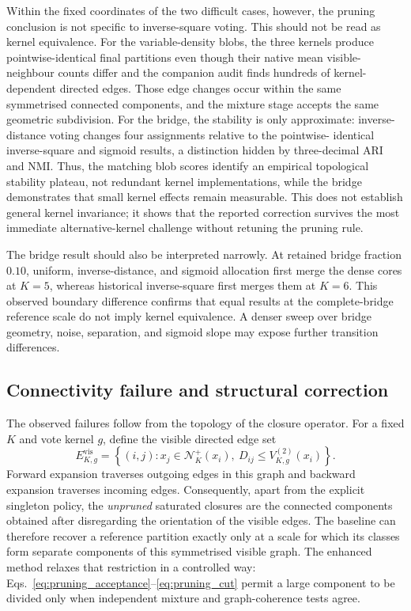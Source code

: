 \documentclass[pdflatex,sn-mathphys-num]{sn-jnl}
\newcommand{\calN}{\mathcal{N}}
\begin{document}
Within the fixed coordinates of the two difficult cases, however, the pruning
conclusion is not specific to inverse-square voting.  This should not be read
as kernel equivalence.  For the variable-density blobs, the three kernels
produce pointwise-identical final partitions even though their native mean
visible-neighbour counts differ and the companion audit finds hundreds of
kernel-dependent directed edges.  Those edge changes occur within the same
symmetrised connected components, and the mixture stage accepts the same
geometric subdivision.  For the bridge, the stability is only approximate:
inverse-distance voting changes four assignments relative to the pointwise-
identical inverse-square and sigmoid results, a distinction hidden by
three-decimal ARI and NMI.  Thus,
the matching blob scores identify an empirical topological stability plateau,
not redundant kernel implementations, while the bridge demonstrates that
small kernel effects remain measurable.  This does not establish general
kernel invariance; it shows that the reported correction survives the most
immediate alternative-kernel challenge without retuning the pruning rule.

The bridge result should also be interpreted narrowly.  At retained bridge
fraction $0.10$, uniform, inverse-distance, and sigmoid allocation first merge
the dense cores at $K=5$, whereas historical inverse-square first merges them
at $K=6$.  This observed boundary difference confirms that equal results at
the complete-bridge reference scale do not imply kernel equivalence.  A denser
sweep over bridge geometry, noise, separation, and sigmoid slope may expose
further transition differences.

\subsection{Connectivity failure and structural correction}

The observed failures follow from the topology of the closure operator.  For a
fixed $K$ and vote kernel $g$, define the visible directed edge set
\begin{equation}
E^{\mathrm{vis}}_{K,g}=\left\{(i,j):
x_j\in\calN_K^+(x_i),\ D_{ij}\leq V_{K,g}^{(2)}(x_i)\right\}.
\label{eq:visible_edge_set}
\end{equation}
Forward expansion traverses outgoing edges in this graph and backward
expansion traverses incoming edges.  Consequently, apart from the explicit
singleton policy, the \emph{unpruned} saturated closures are the connected
components obtained after disregarding the orientation of the visible edges.
The baseline can therefore recover a reference partition exactly only at a
scale for which its classes form separate components of this symmetrised
visible graph.  The enhanced method relaxes that restriction in a controlled
way: Eqs.~\eqref{eq:pruning_acceptance}--\eqref{eq:pruning_cut} permit a large
component to be divided only when independent mixture and graph-coherence
tests agree.
\end{document}
